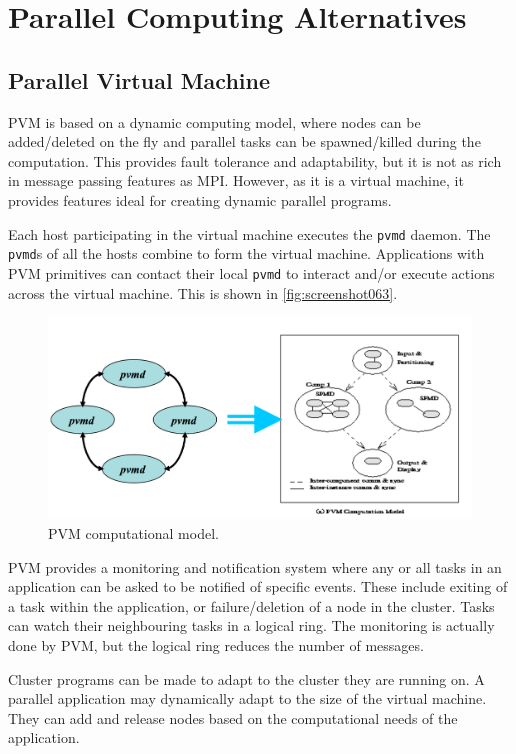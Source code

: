 \chapter{Parallel Computing Alternatives}
\section{Parallel Virtual Machine}
PVM is based on a dynamic computing model, where nodes can be added/deleted on the fly and parallel tasks can be spawned/killed during the computation. This provides fault tolerance and adaptability, but it is not as rich in message passing features as MPI. However, as it is a virtual machine, it provides features ideal for creating dynamic parallel programs.

Each host participating in the virtual machine executes the \texttt{pvmd} daemon. The \texttt{pvmd}s of all the hosts combine to form the virtual machine. Applications with PVM primitives can contact their local \texttt{pvmd} to interact and/or execute actions across the virtual machine. This is shown in \autoref{fig:screenshot063}.

\begin{figure}
\centering
\includegraphics[width=0.7\linewidth]{figures/screenshot063}
\caption{PVM computational model.}
\label{fig:screenshot063}
\end{figure}

PVM provides a monitoring and notification system where any or all tasks in an application can be asked to be notified of specific events. These include exiting of a task within the application, or failure/deletion of a node in the cluster. Tasks can watch their neighbouring tasks in a logical ring. The monitoring is actually done by PVM, but the logical ring reduces the number of messages.

Cluster programs can be made to adapt to the cluster they are running on. A parallel application may dynamically adapt to the size of the virtual machine. They can add and release nodes based on the computational needs of the application.

